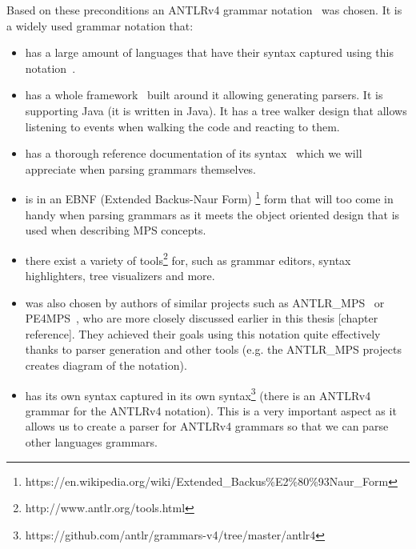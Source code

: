 Based on these preconditions an ANTLRv4 grammar notation~\cite{ANTLR4reference} was chosen. It is a widely used grammar notation that:

\begin{itemize}
	\item has a large amount of languages that have their syntax captured using this notation~\cite{ANTLR4grammars}.

	\item has a whole framework~\cite{ANTLR4} built around it allowing generating parsers. It is supporting Java (it is written in Java). It has a tree walker design that allows listening to events when walking the code and reacting to them.

	\item has a thorough reference documentation of its syntax~\cite{ANTLR4reference} which we will appreciate when parsing grammars themselves.
	
	\item is in an EBNF (Extended Backus-Naur Form) \footnote{https://en.wikipedia.org/wiki/Extended{\_}Backus\%E2\%80\%93Naur{\_}Form} form that will too come in handy when parsing grammars as it meets the object oriented design that is used when describing MPS concepts.
	
	\item there exist a variety of tools\footnote{http://www.antlr.org/tools.html} for, such as grammar editors, syntax highlighters, tree visualizers and more.
	
	\item was also chosen by authors of similar projects such as ANTLR{\_}MPS~\cite{ANTLR2MPS} or PE4MPS~\cite{PE4MPS}, who are more closely discussed earlier in this thesis [chapter reference]. They achieved their goals using this notation quite effectively thanks to parser generation and other tools (e.g. the ANTLR{\_}MPS projects creates diagram of the notation).
	
	\item has its own syntax captured in its own syntax\footnote{https://github.com/antlr/grammars-v4/tree/master/antlr4} (there is an ANTLRv4 grammar for the ANTLRv4 notation). This is a very important aspect as it allows us to create a parser for ANTLRv4 grammars so that we can parse other languages grammars.
\end{itemize}